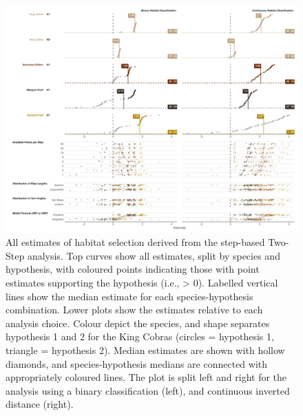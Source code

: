 \documentclass[10pt,a4paper]{article}
\begin{document}
\begin{figure}
\includegraphics[width=1\linewidth]{../../figures/specCurve_twoStep} \caption{All estimates of habitat selection derived from the step-based Two-Step analysis. Top curves show all estimates, split by species and hypothesis, with coloured points indicating those with point estimates supporting the hypothesis (i.e., > 0). Labelled vertical lines show the median estimate for each species-hypothesis combination. Lower plots show the estimates relative to each analysis choice. Colour depict the species, and shape separates hypothesis 1 and 2 for the King Cobras (circles = hypothesis 1, triangle = hypothesis 2). Median estimates are shown with hollow diamonds, and species-hypothesis medians are connected with appropriately coloured lines. The plot is split left and right for the analysis using a binary classification (left), and continuous inverted distance (right).}\label{fig:specCurveTwoStep}
\end{figure}
\end{document}
